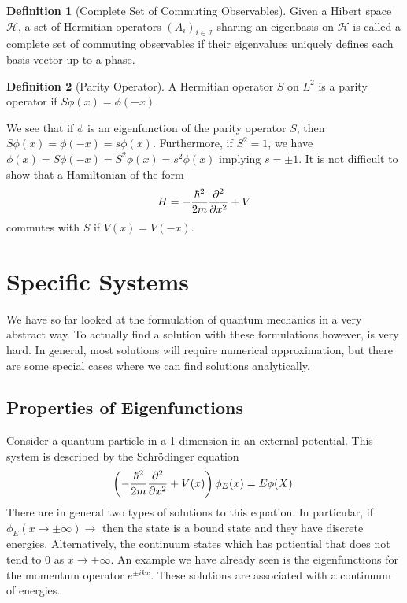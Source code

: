 \documentclass[]{article}
\theoremstyle{definition}
\theoremstyle{definition}
\newtheorem{definition}{Definition}[section]
\begin{document}
\begin{definition}[Complete Set of Commuting Observables]
  Given a Hibert space \(\mathcal{H}\), a set of Hermitian operators 
  \((A_i)_{i \in \mathcal{I}}\) sharing an eigenbasis on \(\mathcal{H}\) 
  is called a complete set of commuting observables if their eigenvalues 
  uniquely defines each basis vector up to a phase.
\end{definition}

\begin{definition}[Parity Operator]
  A Hermitian operator \(S\) on \(L^2\) is a parity operator if 
  \(S\phi(x) = \phi(-x)\).
\end{definition}

We see that if \(\phi\) is an eigenfunction of the parity operator \(S\), then 
\(S \phi(x) = \phi(-x) = s\phi(x)\). Furthermore, if \(S^2 = 1\), we have 
\(\phi(x) = S\phi(-x) = S^2 \phi(x) = s^2 \phi(x)\) implying \(s = \pm 1\).
It is not difficult to show that a Hamiltonian of the form 
\[H = - \frac{\hbar^2}{2m} \pdv[2]{x} + V\]
commutes with \(S\) if \(V(x) = V(-x)\).

\newpage
\section{Specific Systems}

We have so far looked at the formulation of quantum mechanics in a very 
abstract way. To actually find a solution with these formulations however, 
is very hard. In general, most solutions will require numerical approximation,
but there are some special cases where we can find solutions analytically.

\subsection{Properties of Eigenfunctions}

Consider a quantum particle in a 1-dimension in an external potential. This 
system is described by the Schrödinger equation 
\[\left(-\frac{\hbar^2}{2m} \pdv[2]{x} + V(x)\right) \phi_E(x) = E\phi(X).\]
There are in general two types of solutions to this equation. In particular, 
if \(\phi_E(x \to \pm \infty) \to\) then the state is a bound state and they 
have discrete energies. Alternatively, the continuum states which has potiential 
that does not tend to 0 as \(x \to \pm \infty\). An example we have already seen 
is the eigenfunctions for the momentum operator \(e^{\pm ikx}\). These 
solutions are associated with a continuum of energies.
\end{document}
